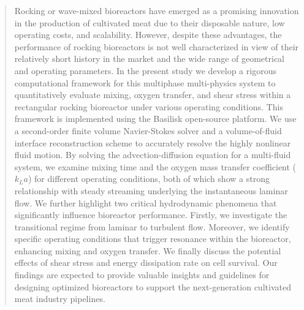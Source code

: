 \documentclass[final,3p,times,twocolumn,authoryear]{elsarticle}
\theoremstyle{definition}
\begin{document}
\begin{frontmatter}
\begin{abstract}
Rocking or wave-mixed bioreactors have emerged as a promising innovation in the production of cultivated meat due to their disposable nature, low operating costs, and scalability. However, despite these advantages, the performance of rocking bioreactors is not well characterized in view of their relatively short history in the market and the wide range of geometrical and operating parameters. In the present study we develop a rigorous computational framework for this multiphase multi-physics system to quantitatively evaluate mixing, oxygen transfer, and shear stress within a rectangular rocking bioreactor under various operating conditions. This framework is implemented using the Basilisk open-source platform. We use a second-order finite volume Navier-Stokes solver and a volume-of-fluid interface reconstruction scheme to accurately resolve the highly nonlinear fluid motion. 
By solving the advection-diffusion equation for a multi-fluid system, we examine mixing time and the oxygen mass transfer coefficient ($k_La$) for different operating conditions, both of which show a strong relationship with steady streaming underlying the instantaneous laminar flow.
We further highlight two critical hydrodynamic phenomena that significantly influence bioreactor performance. Firstly, we investigate the transitional regime from laminar to turbulent flow. Moreover, we identify specific operating conditions that trigger resonance within the bioreactor, enhancing mixing and oxygen transfer. We finally discuss the potential effects of shear stress and energy dissipation rate on cell survival. Our findings are expected to provide valuable insights and guidelines for designing optimized bioreactors to support the next-generation cultivated meat industry pipelines.
\end{abstract}





\end{frontmatter}
\end{document}

